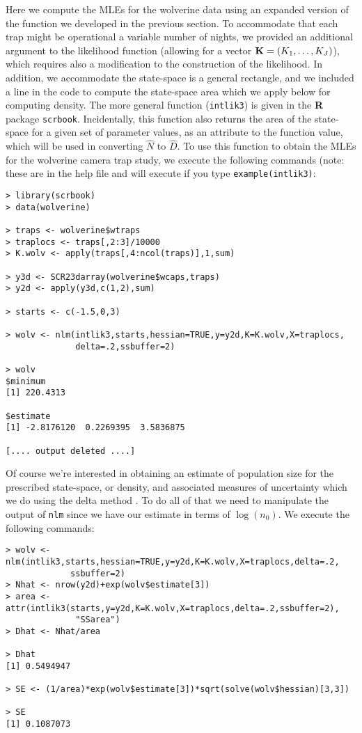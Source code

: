 Here we compute the MLEs for the wolverine data using an expanded
version of the function we developed in the previous section. To
accommodate that each trap might be operational a variable number of
nights, we provided an additional argument to the likelihood function
(allowing for a vector ${\bf K}= (K_{1},\ldots,K_{J})$), which requires also a modification to the
construction of the likelihood.  In addition,
we accommodate  the state-space is a general rectangle, and
we included a line in the code to compute the state-space area which
we apply below for computing density.  The more general function
(\mbox{\tt intlik3}) is given in the {\bf R} package \mbox{\tt scrbook}. 
Incidentally, this function also returns the area of the state-space for a given set
of parameter values, as an attribute to the function value, which will
be used in converting $\hat{N}$ to $\hat{D}$.
To use this function to obtain the MLEs for the wolverine camera trap
study, we execute the following commands (note: these are in the help
file and will execute if you type \mbox{\tt example(intlik3)}:
{\small
\begin{verbatim}
> library(scrbook)
> data(wolverine)
 
> traps <- wolverine$wtraps
> traplocs <- traps[,2:3]/10000
> K.wolv <- apply(traps[,4:ncol(traps)],1,sum)

> y3d <- SCR23darray(wolverine$wcaps,traps)
> y2d <- apply(y3d,c(1,2),sum)

> starts <- c(-1.5,0,3)

> wolv <- nlm(intlik3,starts,hessian=TRUE,y=y2d,K=K.wolv,X=traplocs,
              delta=.2,ssbuffer=2)

> wolv
$minimum
[1] 220.4313

$estimate
[1] -2.8176120  0.2269395  3.5836875

[.... output deleted ....]
\end{verbatim}
}
Of course we're interested in obtaining an estimate of population size
for the prescribed state-space, or density, and associated measures of
uncertainty which we do using the delta method
\citep[][Appendix F4]{williams_etal:2002}.
To do all of that we need to manipulate the output of
\mbox{\tt nlm} since we have our  estimate in terms of $\log(n_{0})$. We execute the following commands:
{\small 
\begin{verbatim}
> wolv <- nlm(intlik3,starts,hessian=TRUE,y=y2d,K=K.wolv,X=traplocs,delta=.2,
             ssbuffer=2)
> Nhat <- nrow(y2d)+exp(wolv$estimate[3])
> area <- attr(intlik3(starts,y=y2d,K=K.wolv,X=traplocs,delta=.2,ssbuffer=2), 
              "SSarea")
> Dhat <- Nhat/area

> Dhat
[1] 0.5494947

> SE <- (1/area)*exp(wolv$estimate[3])*sqrt(solve(wolv$hessian)[3,3])

> SE
[1] 0.1087073
\end{verbatim}
} 
